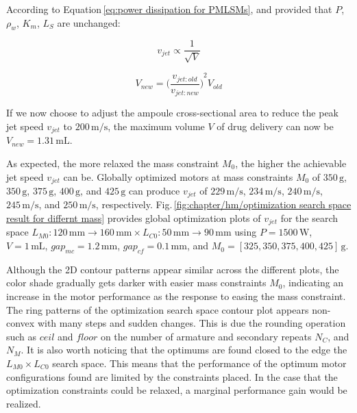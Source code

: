             
        According to Equation\,\ref{eq:power dissipation for PMLSMs}, and provided that $P$, $\rho_w$, $K_m$, $L_S$ are unchanged:
            
            
        \begin{equation}
            v_{jet}\propto\frac{1}{\sqrt{V}}
            \label{eq:v_jet and V}
        \end{equation}
            
            
        \begin{equation}
            V_{new}={\bigg(\frac{v_{jet:old}}{v_{jet:new}} \bigg)}^2 V_{old}
            \label{eq:v_jet and V ratio}
        \end{equation}
        
        

            
            
        If we now choose to adjust the ampoule cross-sectional area to reduce the peak jet speed $v_{jet}$ to $200\,\mathrm{m/s}$, the maximum volume $V$ of drug delivery can now be $V_{new}=1.31\,\mathrm{mL}$. 
            
            
        As expected, the more relaxed the mass constraint $M_0$, the higher the achievable jet speed $v_{jet}$ can be. Globally optimized motors at mass constraints $M_0$ of $350\,\mathrm{g}$, $350\,\mathrm{g}$, $375\,\mathrm{g}$, $400\,\mathrm{g}$, and $425\,\mathrm{g}$ can produce $v_{jet}$ of $229\,\mathrm{m/s}$, $234\,\mathrm{m/s}$, $240\,\mathrm{m/s}$, $245\,\mathrm{m/s}$, and $250\,\mathrm{m/s}$, respectively. Fig.\,\ref{fig:chapter/hm/optimization search space result for differnt mass} provides global optimization plots of $v_{jet}$ for the search space $L_{M0}:120\,\mathrm{mm}\rightarrow 160\,\mathrm{mm} \times L_{C0}:50\,\mathrm{mm}\rightarrow 90\,\mathrm{mm}$ using $P=1500\,\mathrm{W}$, $V=1\,\mathrm{mL}$, $gap_{mc}=1.2\,\mathrm{mm}$, $gap_{cf}=0.1\,\mathrm{mm}$,  and $M_0=[325,350,375,400,425]\,\mathrm{g}$. 
        
        Although the 2D contour patterns appear similar across the different plots, the color shade gradually gets darker with easier mass constraints $M_0$, indicating an increase in the motor performance as the response to easing the mass constraint. The ring patterns of the optimization search space contour plot appears non-convex with many steps and sudden changes. This is due the rounding operation such as $ceil$ and $floor$ on the number of armature and secondary repeats $N_C$, and $N_M$. It is also worth noticing that the optimums are found closed to the edge the $L_{M0} \times L_{C0}$ search space. This means that the performance of the optimum motor configurations found are limited by the constraints placed. In the case that the optimization constraints could be relaxed, a marginal performance gain would be realized. 


